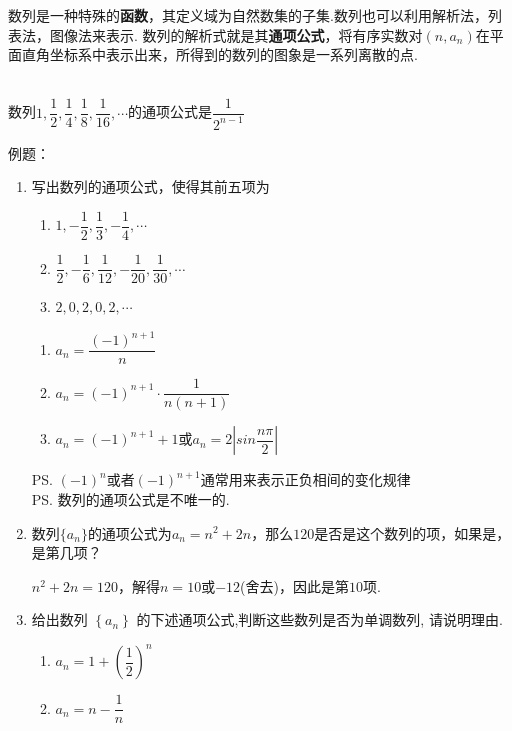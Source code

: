 数列是一种特殊的\textbf{函数}，其定义域为自然数集的子集.数列也可以利用解析法，列表法，图像法来表示. 数列的解析式就是其\textbf{通项公式}，将有序实数对$(n, a_n)$在平面直角坐标系中表示出来，所得到的数列的图象是一系列离散的点.
\begin{example} \\
    数列$1, \dfrac{1}{2}, \dfrac{1}{4}, \dfrac{1}{8},\dfrac{1}{16},\cdots$的通项公式是$\dfrac{1}{2^{n-1}}$
\end{example}
例题：
\begin{enumerate}
    \item 写出数列的通项公式，使得其前五项为
    \begin{enumerate}
        \item $1, -\dfrac{1}{2}, \dfrac{1}{3}, -\dfrac{1}{4}, \cdots$
        \item $\dfrac{1}{2}, -\dfrac{1}{6}, \dfrac{1}{12}, -\dfrac{1}{20}, \dfrac{1}{30}, \cdots$
        \item $2, 0, 2, 0, 2, \cdots$
    \end{enumerate}
    \begin{jieda}
        \begin{enumerate}
            \item $a_n = \dfrac{(-1)^{n+1}}{n}$
            \item $a_n = (-1)^{n+1} \cdot \dfrac{1}{n(n+1)}$
            \item $a_n = (-1)^{n+1}+1$或$a_n = 2\left|sin\dfrac{n\pi}{2}\right|$
        \end{enumerate}
        \ps $(-1)^n$或者$(-1)^{n+1}$通常用来表示正负相间的变化规律 \\
        \ps 数列的通项公式是不唯一的.
    \end{jieda}    
    \item 数列$\{a_n\}$的通项公式为$a_n = n^2+2n$，那么$120$是否是这个数列的项，如果是，是第几项？
    \begin{jieda}
        $n^2+2n = 120$，解得$n = 10$或$-12$(舍去)，因此是第$10$项.
    \end{jieda}
    \item 给出数列 $ \left\{  {a}_{n}\right\} $ 的下述通项公式,判断这些数列是否为单调数列, 请说明理由.
    \begin{enumerate}
        \item  $ {a}_{n} = 1 + {\left( \dfrac{1}{2}\right) }^{n} $
        \item $ {a}_{n} = n - \dfrac{1}{n} $
    \end{enumerate}
    \begin{jieda}

\end{jieda}
\end{enumerate}
